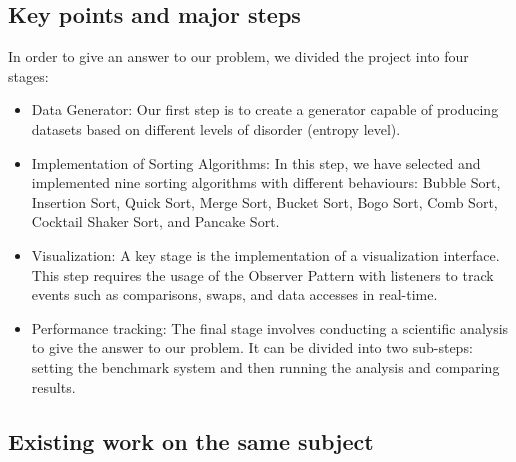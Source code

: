 \documentclass{article}
\begin{document}
\subsection{Key points and major steps}

In order to give an answer to our problem, we divided the project into four stages:

\begin{itemize}
\item Data Generator: Our first step is to create a generator capable of producing datasets based on different levels of disorder (entropy level).
\item Implementation of Sorting Algorithms: In this step, we have selected and implemented nine sorting algorithms with different behaviours: Bubble Sort, Insertion Sort, Quick Sort, Merge Sort, Bucket Sort, Bogo Sort, Comb Sort, Cocktail Shaker Sort, and Pancake Sort.
\item Visualization: A key stage is the implementation of a visualization interface. This step requires the usage of the Observer Pattern with listeners to track events such as comparisons, swaps, and data accesses in real-time.
\item Performance tracking: The final stage involves conducting a scientific analysis to give the answer to our problem. It can be divided into two sub-steps: setting the benchmark system and then running the analysis and comparing results.
\end{itemize}

\subsection{Existing work on the same subject}
\end{document}
